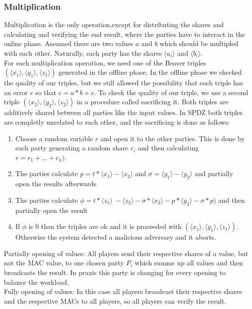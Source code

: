 \documentclass[english,runningheads,a4paper]{llncs}[2018/03/10]
\begin{document}
\subsubsection{Multiplication}

Multiplication is the only operation,except for distributing the shares and calculating and verifying the end result, where the parties have to interact in the online phase.
Assumed there are two values \( a\) and \( b\) which should be multipled with each other. Naturally, each party has the shares \(\langle a_i\rangle \) and \(\langle b_i\rangle \).\\
For each multiplication operation, we need one of the Beaver triples \( (\langle x_1 \rangle ,\langle y_1\rangle , \langle z_1\rangle )\) generated in the offline phase. In the offline phase we checked the quality of our triples, but we still allowed the possibility that each triple has an error \(e\) so that \(c=a*b+e\). To check the quality of our triple, we use a second triple \( (\langle x_2 \rangle ,\langle y_2\rangle ,\langle z_2\rangle )\) in a procedure called sacrificing it. Both triples are additively shared between all parties like the input values. In SPDZ both triples are completly unrelated to each other, and the sacrificing is done as follows:\\


\begin{enumerate}
\item Choose a random variable \( r\) and open it to the other parties. This is done by each party generating a random share \(r_i\) and then calculating \(r=r_1+...+r_n)\).
\item The parties calculate  \( p=t*\langle x_1 \rangle - \langle x_2 \rangle \) and \( \sigma=\langle y_1 \rangle -  \langle y_2 \rangle \) and partially open the results afterwards
\item The parties calculate \(\phi = t * \langle z_1 \rangle\ - \langle z_2 \rangle - \sigma * \langle x_2 \rangle - p * \langle y_2 \rangle - \sigma * p)\) and then partially open the result
\item If \( \phi \) is 0 then the triples are ok and it is proceeded with \( (\langle x_1 \rangle ,\langle y_1\rangle , \langle z_1\rangle )\). Otherwise the system detected a malicious adversary and it aborts.\\
\end{enumerate}


Partially opening  of values: All players send their respective shares of a value, but not the MAC value, to one chosen party \(P_i\) which summs up all values and then broadcasts the result. In praxis this party is changing for every opening to balance the workload.\\
Fully opening of values: In this case all players broadcast their respective shares and the respective MACs to all players, so all players can verify the result.\\
\end{document}
